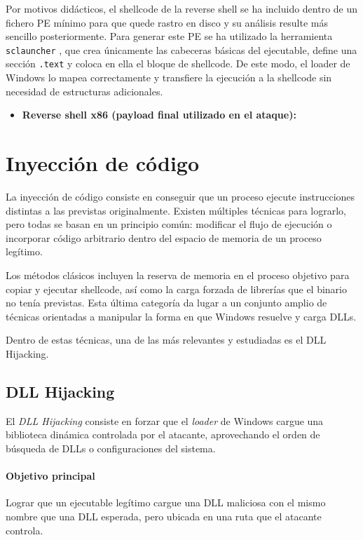 Por motivos didácticos, el shellcode de la reverse shell se ha incluido dentro de un fichero PE mínimo para que quede rastro en disco y su análisis resulte más sencillo posteriormente.
Para generar este PE se ha utilizado la herramienta \texttt{sclauncher} \cite{sclauncher}, que crea únicamente las cabeceras básicas del ejecutable, define una sección \texttt{.text} y coloca en ella el bloque de shellcode. De este modo, el loader de Windows lo mapea correctamente y transfiere la ejecución a la shellcode sin necesidad de estructuras adicionales.

\begin{itemize}
\item \textbf{Reverse shell x86 (payload final utilizado en el ataque):} \cite{github-reverseshell-x86}
\end{itemize}

\section{Inyección de código}

La inyección de código consiste en conseguir que un proceso ejecute instrucciones distintas a las previstas originalmente. Existen múltiples técnicas para lograrlo, pero todas se basan en un principio común: modificar el flujo de ejecución o incorporar código arbitrario dentro del espacio de memoria de un proceso legítimo.

Los métodos clásicos incluyen la reserva de memoria en el proceso objetivo para copiar y ejecutar shellcode, así como la carga forzada de librerías que el binario no tenía previstas. Esta última categoría da lugar a un conjunto amplio de técnicas orientadas a manipular la forma en que Windows resuelve y carga DLLs.

Dentro de estas técnicas, una de las más relevantes y estudiadas es el DLL Hijacking. 

\subsection{DLL Hijacking}

El \textit{DLL Hijacking} consiste en forzar que el \textit{loader} de Windows cargue una biblioteca dinámica controlada por el atacante, aprovechando el orden de búsqueda de DLLs o configuraciones del sistema.

\paragraph{Objetivo principal}  
Lograr que un ejecutable legítimo cargue una DLL maliciosa con el mismo nombre que una DLL esperada, pero ubicada en una ruta que el atacante controla.

